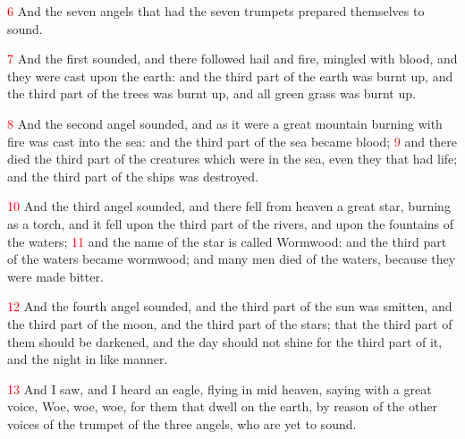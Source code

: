 \documentclass[12pt,twoside]{memoir}
\newcommand{\vnum}[1]{\textcolor{red}{\normalsize{#1}}}
\begin{document}
\vnum{6} And the seven angels that had the seven trumpets prepared themselves to sound.

\vnum{7} And the first sounded, and there followed hail and fire, mingled with blood, and they were cast upon the earth: and the third part of the earth was burnt up, and the third part of the trees was burnt up, and all green grass was burnt up.

\vnum{8} And the second angel sounded, and as it were a great mountain burning with fire was cast into the sea: and the third part of the sea became blood; %
\vnum{9} and there died the third part of the creatures which were in the sea, even they that had life; and the third part of the ships was destroyed.

\vnum{10} And the third angel sounded, and there fell from heaven a great star, burning as a torch, and it fell upon the third part of the rivers, and upon the fountains of the waters; %
\vnum{11} and the name of the star is called Wormwood: and the third part of the waters became wormwood; and many men died of the waters, because they were made bitter.

\vnum{12} And the fourth angel sounded, and the third part of the sun was smitten, and the third part of the moon, and the third part of the stars; that the third part of them should be darkened, and the day should not shine for the third part of it, and the night in like manner.

\vnum{13} And I saw, and I heard an eagle, flying in mid heaven, saying with a great voice, Woe, woe, woe, for them that dwell on the earth, by reason of the other voices of the trumpet of the three angels, who are yet to sound.

\end{document}
